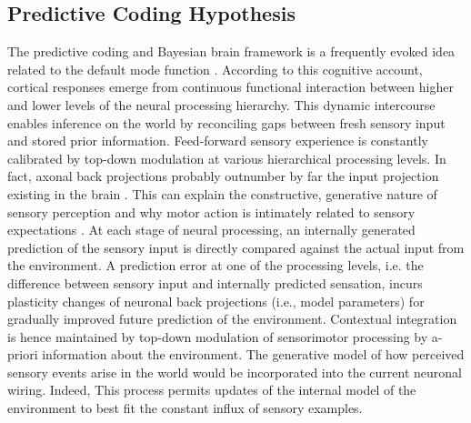 \documentclass[10pt,letterpaper]{article}
\begin{document}
\subsection{Predictive Coding Hypothesis}
The predictive coding and Bayesian brain framework
is a frequently evoked idea related to the default mode function
\citep{bar2007}.
According to this cognitive account,
cortical responses emerge from continuous functional interaction between
higher and lower levels of the neural processing hierarchy.
This dynamic intercourse enables inference on the world by reconciling
gaps between fresh sensory input and stored prior information.
Feed-forward sensory experience is constantly calibrated by
top-down modulation at various hierarchical processing levels.
In fact, axonal
back projections probably outnumber by far the input projection
existing in the brain \citep{salin1995corticocortical}.
This can explain the constructive, generative nature of sensory perception
\citep{friston2010free} and
why motor action is intimately related to sensory expectations
\citep{wolpert1995internal, kording2004bayesian}.
At each stage of neural processing,
an internally generated prediction of the sensory input is
directly compared against the actual input from the environment.
A prediction error at one of the processing levels,
i.e. the difference between sensory input
and internally predicted sensation,
incurs plasticity changes of neuronal back projections (i.e., model parameters)
for gradually improved future prediction of the environment.
Contextual integration is hence maintained by top-down modulation of sensorimotor
processing by a-priori information about the environment.
The generative model of how perceived sensory events arise in the
world would be incorporated into
the current neuronal wiring.
Indeed,
This process permits updates of the internal model of the environment
to best fit the constant influx of sensory examples.
\end{document}
